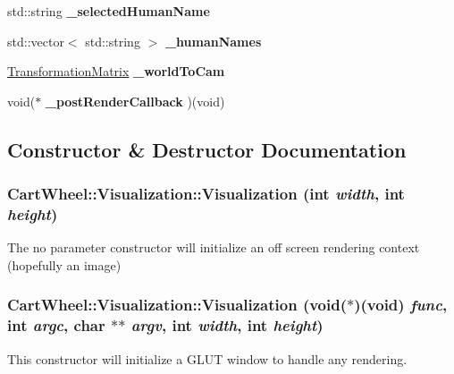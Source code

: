 \begin{DoxyCompactItemize}
\item 
\hypertarget{classCartWheel_1_1Visualization_af0c8b89c1609ce14dbd24e3556e29f16}{
std::string {\bfseries \_\-selectedHumanName}}
\label{classCartWheel_1_1Visualization_af0c8b89c1609ce14dbd24e3556e29f16}

\item 
\hypertarget{classCartWheel_1_1Visualization_af4fc5d6aaebf976ece968b2f9510d464}{
std::vector$<$ std::string $>$ {\bfseries \_\-humanNames}}
\label{classCartWheel_1_1Visualization_af4fc5d6aaebf976ece968b2f9510d464}

\item 
\hypertarget{classCartWheel_1_1Visualization_a4b5ee43e8e578668f65131a087c6bf27}{
\hyperlink{classCartWheel_1_1Math_1_1TransformationMatrix}{TransformationMatrix} {\bfseries \_\-worldToCam}}
\label{classCartWheel_1_1Visualization_a4b5ee43e8e578668f65131a087c6bf27}

\item 
\hypertarget{classCartWheel_1_1Visualization_a9e34f1f46425d1b54eac923b1f2e9c80}{
void($\ast$ {\bfseries \_\-postRenderCallback} )(void)}
\label{classCartWheel_1_1Visualization_a9e34f1f46425d1b54eac923b1f2e9c80}

\end{DoxyCompactItemize}


\subsection{Constructor \& Destructor Documentation}
\hypertarget{classCartWheel_1_1Visualization_a8150cffbeaa2415d4d650a426e719578}{
\subsubsection[{Visualization}]{\setlength{\rightskip}{0pt plus 5cm}CartWheel::Visualization::Visualization (int {\em width}, \/  int {\em height})}}
\label{classCartWheel_1_1Visualization_a8150cffbeaa2415d4d650a426e719578}
The no parameter constructor will initialize an off screen rendering context (hopefully an image) \hypertarget{classCartWheel_1_1Visualization_acea06ec4f96949dd446f34309fdd1f70}{
\subsubsection[{Visualization}]{\setlength{\rightskip}{0pt plus 5cm}CartWheel::Visualization::Visualization (void($\ast$)(void) {\em func}, \/  int {\em argc}, \/  char $\ast$$\ast$ {\em argv}, \/  int {\em width}, \/  int {\em height})}}
\label{classCartWheel_1_1Visualization_acea06ec4f96949dd446f34309fdd1f70}
This constructor will initialize a GLUT window to handle any rendering. 

